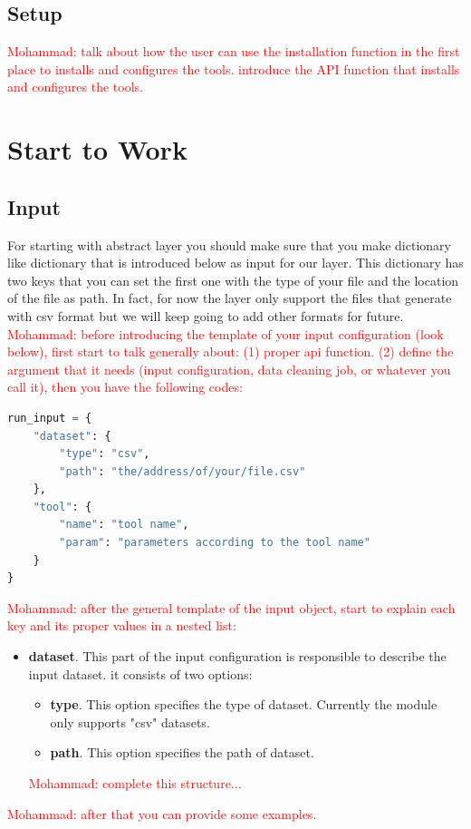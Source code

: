 \documentclass[12pt]{article}
\newcommand{\mohammad}[1]{\textcolor{red}{Mohammad: #1}}
\begin{document}
\subsection{Setup}
\mohammad{talk about how the user can use the installation function in the first place to installs and configures the tools. introduce the API function that installs and configures the tools.}


\section{Start to Work}

\subsection{Input}
For starting with abstract layer you should make sure that you make dictionary like dictionary that is introduced below as input for our layer.
This dictionary has two keys that you can set the first one with the type of your file and the location of the file as path. In fact, for now the layer only support the files that generate with csv format but we will keep going to add other formats for future. 
\mohammad{before introducing the template of your input configuration (look below), first start to talk generally about: (1) proper api function. (2) define the argument that it needs (input configuration, data cleaning job, or whatever you call it), then you have the following codes:}
\begin{lstlisting}[language=Python]
run_input = {
	"dataset": {
		"type": "csv",
		"path": "the/address/of/your/file.csv"
	},
	"tool": {
		"name": "tool name",
		"param": "parameters according to the tool name"
	}
}
\end{lstlisting}
\mohammad{after the general template of the input object, start to explain each key and its proper values in a nested list:}
\begin{itemize}
	\item \textbf{dataset}. This part of the input configuration is responsible to describe the input dataset. it consists of two options:
	\begin{itemize}
		\item \textbf{type}. This option specifies the type of dataset. Currently the module only supports "csv" datasets.
		\item \textbf{path}. This option specifies the path of dataset.
	\end{itemize}
	\mohammad{complete this structure...}
\end{itemize}
\mohammad{after that you can provide some examples.}
\end{document}
